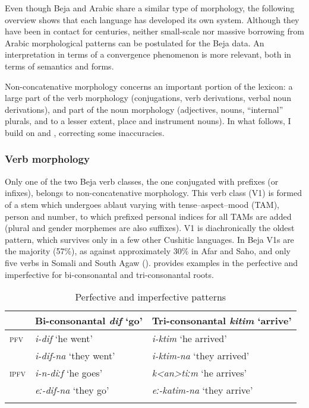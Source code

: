 \documentclass[output=paper]{langsci/langscibook}
\begin{document}
Even though Beja and Arabic share a similar type of morphology, the following overview shows that each language has developed its own system. Although they have been in contact for centuries, neither small-scale nor massive borrowing from Arabic morphological patterns can be postulated for the Beja data. An interpretation in terms of a convergence phenomenon is more relevant, both in terms of semantics and forms.

Non-concatenative morphology concerns an important portion of the lexicon: a large part of the verb morphology (conjugations, verb derivations, verbal noun derivations), and part of the noun morphology (adjectives, nouns, “internal” plurals, and to a lesser extent, place and instrument nouns). In what follows, I build on \citet{Vanhove2012} and \citet{Vanhove2017}, correcting some inaccuracies.


 \subsubsection{Verb morphology}
\largerpage
Only one of the two Beja verb classes, the one conjugated with prefixes (or infixes), belongs to non-concatenative morphology. This verb class (V1) is formed of a stem which undergoes ablaut varying with tense--aspect--mood (TAM), person and number, to which prefixed personal indices for all TAMs are added (plural and gender morphemes are also suffixes). V1 is diachronically the oldest pattern, which survives only in a few other Cushitic languages. In Beja V1s are the majority (57\%), as against approximately 30\% in Afar and Saho, and only five verbs in Somali and South Agaw (\citealt[256]{Cohen1988}).  provides examples in the perfective and imperfective for bi-consonantal and tri-consonantal roots. 

\begin{table}
\begin{tabular}{lll}
\lsptoprule
& Bi-consonantal \textit{dif} ‘go’ & Tri-consonantal \textit{kitim} ‘arrive’\\\midrule
\textsc{pfv} & \textit{i-dif} ‘he went’  & \textit{i-ktim} ‘he arrived’\\
{} & \textit{i-dif-na} ‘they went’ & \textit{i-ktim-na} ‘they arrived’\\
\textsc{ipfv} & \textit{i-n-diːf} ‘he goes’ & \textit{k<an>tiːm} ‘he arrives’\\
{} &\textit{eː-dif-na} ‘they go’ & \textit{eː-katim-na} ‘they arrive’\\
\lspbottomrule
\end{tabular} 
\caption{Perfective and imperfective patterns}
\label{tab:vanhove:2}
\end{table}
\end{document}
